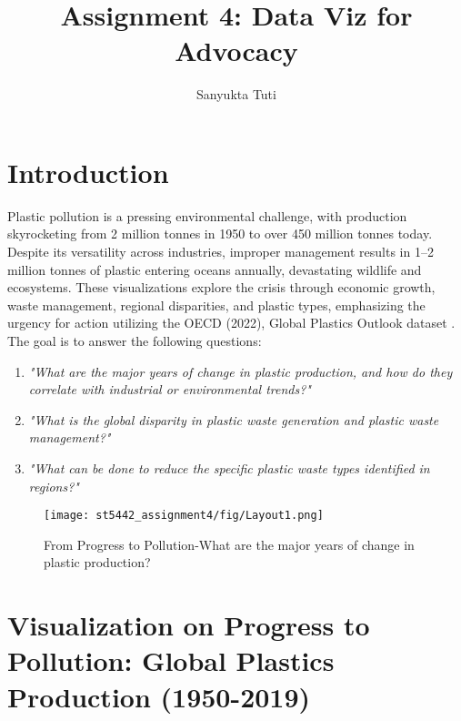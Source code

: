 \documentclass{article}
\title{Assignment 4: Data Viz for Advocacy}
\author{Sanyukta Tuti}
\begin{document}
  \maketitle %
  \thispagestyle{empty}

\section{Introduction}
\label{sec:sec1}

\maketitle

Plastic pollution is a pressing environmental challenge, with production skyrocketing from 2 million tonnes in 1950 to over 450 million tonnes today. Despite its versatility across industries, improper management results in 1–2 million tonnes of plastic entering oceans annually, devastating wildlife and ecosystems. These visualizations explore the crisis through economic growth, waste management, regional disparities, and plastic types, emphasizing the urgency for action utilizing the OECD (2022), Global Plastics Outlook dataset \cite{dataset}. The goal is to answer the following questions:

\begin{enumerate}
    \item \textit{"What are the major years of change in plastic production, and how do they correlate with industrial or environmental trends?"}
    \item \textit{"What is the global disparity in plastic waste generation and plastic waste management?"}
    \item \textit{"What can be done to reduce the specific plastic waste types identified in regions?"}
\end{enumerate}

\begin{figure}[ht] 
    \centering
    \texttt{[image: st5442\_assignment4/fig/Layout1.png]}
    \caption{
        From Progress to Pollution-What are the major years of change in plastic production?
    }
    \label{fig:Import}
\end{figure}


\section{Visualization on Progress to Pollution: Global Plastics Production (1950-2019)}
\end{document}
